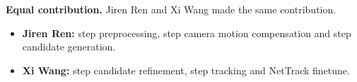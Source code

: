 \noindent\textbf{Equal contribution.} Jiren Ren and Xi Wang made the same contribution.

\begin{itemize}
  \item \textbf{Jiren Ren:} step preprocessing,  step camera motion compensation and step candidate generation.
  \item \textbf{Xi Wang:} step candidate refinement, step tracking and NetTrack finetune.
\end{itemize}